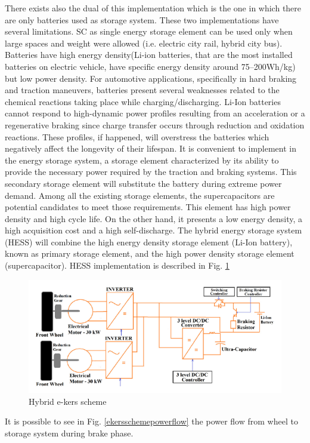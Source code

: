 \documentclass[11pt]{article}
\begin{document}
There exists also the dual of this implementation which is the one in which there are only batteries used as storage system. These two implementations have several limitations. SC as single energy storage element can be used only when large spaces and weight were allowed (i.e. electric city rail, hybrid city bus). Batteries have high energy density(Li-ion batteries, that are the most installed batteries on electric vehicle, have specific energy density around 75–200Wh/kg) but low power density. For automotive applications, specifically in hard braking and traction maneuvers, batteries present several weaknesses related to the chemical reactions taking place while charging/discharging. Li-Ion batteries cannot respond to high-dynamic power profiles resulting from an acceleration or a regenerative
braking since charge transfer occurs through reduction and oxidation reactions. These profiles, if happened, will overstress the batteries which negatively affect the longevity of their lifespan. It is convenient to implement in the energy storage system, a storage element characterized by its ability to provide the necessary power required by the traction and braking systems. This secondary storage element will substitute the battery during extreme power demand. Among all the existing storage elements, the supercapacitors are potential candidates to meet those requirements. This element has high power density and high cycle life. On the other hand, it presents a low energy density, a high acquisition cost and a high self-discharge. The hybrid energy storage system (HESS) will combine the high energy density storage element (Li-Ion battery), known as primary storage element, and the high power density storage element (supercapacitor). HESS implementation is described in Fig. \ref{ekersschemehybrid}

\begin{figure}[H]
	\centering
	\includegraphics[width=.6\textwidth]{Images/State_of_the_art/Electric_KERS_scheme_hybrid.PNG}
	\caption{Hybrid e-kers scheme}
	\label{ekersschemehybrid}
\end{figure}

It is possible to see in Fig. \ref{ekersschemepowerflow} the power flow from wheel to storage system during brake phase.
\end{document}
